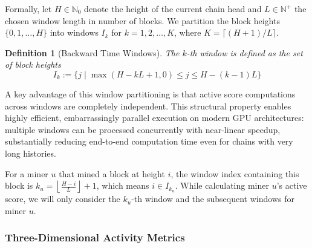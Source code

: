 \documentclass[journal]{IEEEtran}
\newtheorem{definition}{Definition}
\begin{document}
Formally, let $H \in \mathbb{N}_0$ denote the height of the current chain head and $L \in \mathbb{N}^+$ the chosen window length in number of blocks. We partition the block heights $\{0, 1, \dots, H\}$ into windows $I_k$ for $k = 1, 2, \dots, K$, where $K = \lceil (H+1)/L \rceil$.

\begin{definition}[Backward Time Windows]
\label{def:window-partition}
The $k$-th window is defined as the set of block heights
\begin{equation}
I_k := \bigl\{ j \mid \max(H - kL + 1, 0) \le j \le H - (k-1)L \bigr\}
\end{equation}
\end{definition}

A key advantage of this window partitioning is that active score computations across windows are completely independent. This structural property enables highly efficient, embarrassingly parallel execution on modern GPU architectures: multiple windows can be processed concurrently with near-linear speedup, substantially reducing end-to-end computation time even for chains with very long histories.

For a miner \(u\) that mined a block at height \(i\), the window index containing this block is $k_u = \left\lfloor \frac{H - i}{L} \right\rfloor + 1$, which means \(i \in I_{k_u}\). While calculating miner  $u$'s active score, we will only consider the $k_u$-th window and the subsequent windows for miner $u$.

\subsubsection{Three-Dimensional Activity Metrics}


    
    
\end{document}
